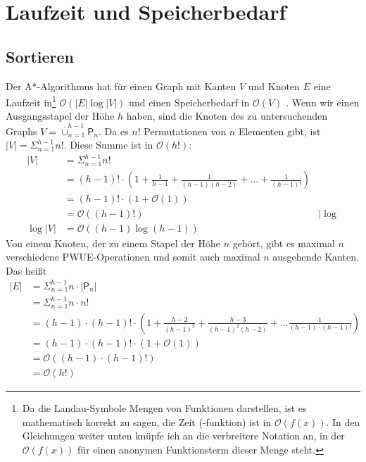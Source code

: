 \documentclass[a4paper,10pt,ngerman]{scrartcl}
\begin{document}
\section{Laufzeit und Speicherbedarf}
\subsection{Sortieren}
Der A*-Algorithmus hat für einen Graph mit Kanten $V$ und Knoten $E$ eine
Laufzeit in\footnote{Da die Landau-Symbole Mengen von Funktionen darstellen, ist es mathematisch korrekt zu sagen, die Zeit (-funktion) ist in $\mathcal{O}(f(x))$.
In den Gleichungen weiter unten knüpfe ich an die verbreitere Notation an, in der $\mathcal{O}(f(x))$ für einen anonymen Funktionsterm dieser Menge steht.} 
$\mathcal{O}(|E| \log |V|)$ und einen Speicherbedarf in
$\mathcal{O}(V)$ \cite[654]{sedgewick_wayne_2011}. Wenn wir einen
Ausgangsstapel der Höhe $h$ haben, sind die Knoten des zu untersuchenden Graphs
$V = \overset{.}\cup_{n=1}^{h-1} \mathsf{P}_n$. Da es $n!$ Permutationen von
$n$ Elementen gibt, ist $|V| = \Sigma_{n=1}^{h-1}n!$. Diese Summe ist in
$\mathcal{O}(h!)$:
\begin{align*}
  |V| & = \Sigma_{n=1}^{h-1}n!                                                                \\
      & = (h-1)! \cdot (1 + \frac{1}{h-1} + \frac{1}{(h-1)(h-2)} + \ldots + \frac{1}{(h-1)!}) \\
      & = (h-1)! \cdot (1 + \mathcal{O}(1))                                                   \\
      & = \mathcal{O}((h-1)!) & | \log \\
  \log |V| & = \mathcal{O}((h-1) \log (h-1))
\end{align*}
Von einem Knoten, der zu einem Stapel der Höhe $n$ gehört, gibt es maximal $n$ verschiedene PWUE-Operationen und somit auch maximal $n$ ausgehende Kanten. Das heißt
\begin{align*}
  |E| & = \Sigma_{n=1}^{h-1} n \cdot |\mathsf{P}_n|                                                   \\
      & = \Sigma_{n=1}^{h-1} n \cdot n!                                                               \\
      & = (h-1) \cdot (h-1)! \cdot (1 + \frac{h-2}{(h-1)^2} + \frac{h-3}{(h-1)^2(h-2)} + \ldots \frac{1}{(h-1) \cdot (h-1)!})\\
      & = (h-1) \cdot (h-1)! \cdot (1 + \mathcal{O}(1)) \\
      & = \mathcal{O}((h-1) \cdot (h-1)!) \\
      & = \mathcal{O}(h!)
\end{align*}
\end{document}
